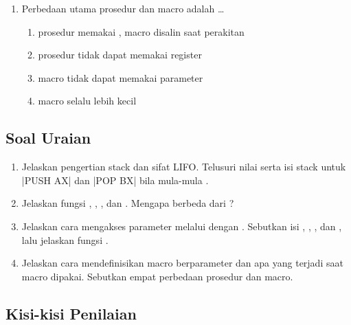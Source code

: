 \begin{enumerate}
    \item Perbedaan utama prosedur dan macro adalah \dots
          \begin{enumerate}
              \item prosedur memakai , macro disalin saat
                    perakitan
              \item prosedur tidak dapat memakai register
              \item macro tidak dapat memakai parameter
              \item macro selalu lebih kecil
          \end{enumerate}
\end{enumerate}

\subsection{Soal Uraian}

\begin{enumerate}
    \item Jelaskan pengertian stack dan sifat LIFO. Telusuri nilai
           serta isi stack untuk \lstasm|PUSH AX| dan
          \lstasm|POP BX| bila  mula-mula .

    \item Jelaskan fungsi , , , dan
          . Mengapa  berbeda dari ?

    \item Jelaskan cara mengakses parameter melalui 
          dengan . Sebutkan isi \code{[BP+0]}, \code{[BP+2]},
          \code{[BP+4]}, dan \code{[BP+6]}, lalu jelaskan fungsi
           .

    \item Jelaskan cara mendefinisikan macro berparameter dan apa
          yang terjadi saat macro dipakai. Sebutkan empat perbedaan
          prosedur dan macro.
\end{enumerate}

\subsection{Kisi-kisi Penilaian}

